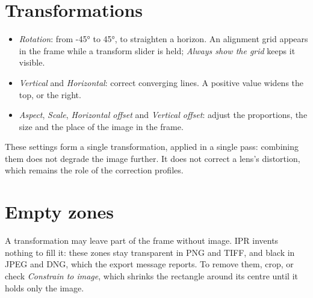 \section{Transformations}
\begin{itemize}
\item \emph{Rotation}: from -45° to 45°, to straighten a horizon. An alignment grid
appears in the frame while a transform slider is held; \emph{Always show the grid}
keeps it visible.
\item \emph{Vertical} and \emph{Horizontal}: correct converging lines. A positive
value widens the top, or the right.
\item \emph{Aspect}, \emph{Scale}, \emph{Horizontal offset} and \emph{Vertical
offset}: adjust the proportions, the size and the place of the image in the frame.
\end{itemize}
These settings form a single transformation, applied in a single pass: combining
them does not degrade the image further. It does not correct a lens's distortion,
which remains the role of the correction profiles.

\section{Empty zones}
A transformation may leave part of the frame without image. IPR invents nothing to
fill it: these zones stay transparent in PNG and TIFF, and black in JPEG and DNG,
which the export message reports. To remove them, crop, or check \emph{Constrain to
image}, which shrinks the rectangle around its centre until it holds only the image.


